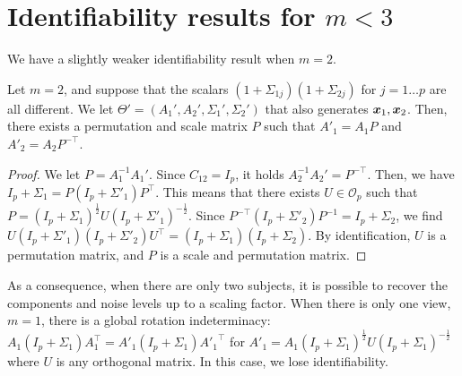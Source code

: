\section{Identifiability results for $m< 3$}
\label{app:identifiability}
We have a slightly weaker identifiability result when $m=2$.
\begin{proposition}
  \label{prop:identifiability_2d}
  Let $m=2$, and suppose that the scalars $(1 + \Sigma_{1j})(1+\Sigma_{2j})$ for $j=1\dots p$ are all different. We let $\Theta'=(A_1', A_2', \Sigma_1',\Sigma_2')$ that also generates $\boldsymbol{x}_1, \boldsymbol{x}_2$. Then, there exists a permutation and scale matrix $P$ such that $A'_1 =A_1P$ and $A'_2 = A_2P^{-\top}$.
\end{proposition}
\begin{proof}
  We let $P=A_1^{-1}A_1'$. Since $C_{12} = I_p$, it holds 
  $A_2^{-1}A_2'= P^{-\top}$. Then, we have
  $I_p + \Sigma_1 = P(I_p + \Sigma'_1)P^{\top}$. This means that there exists $U\in\mathcal{O}_p$ such that $P = (I_p + \Sigma_1)^{\frac12}U(I_p + \Sigma'_1)^{-\frac12}$. Since $P^{-\top}(I_p+\Sigma'_2)P^{-1} = I_p+\Sigma_2$, we find
  $U(I_p+\Sigma'_1)(I_p+\Sigma'_2)U^{\top} = (I_p+\Sigma_1)(I_p+\Sigma_2)$. By identification, $U$ is a permutation matrix, and $P$ is a scale and permutation matrix.
\end{proof}
As a consequence, when there are only two subjects, it is possible to recover the components and noise levels up to a scaling factor.
%
When there is only one view, $m=1$, there is a global rotation indeterminacy: 
$
A_1(I_p + \Sigma_1)A_1^{\top} = A'_1(I_p + \Sigma_1){A'_1}^{\top}
$
for $A'_1 = A_1(I_p + \Sigma_1)^{\frac12}U(I_p + \Sigma_1)^{-\frac12}$ where $U$ is any orthogonal matrix. In this case, we lose identifiability.


